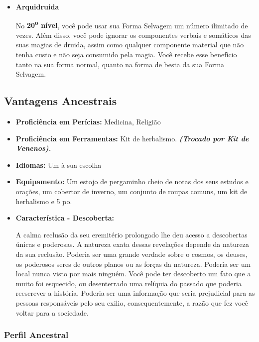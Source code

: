 \documentclass[a4paper,12p]{book}
\begin{document}
\begin{multicols}{2}
\begin{itemize}
		\item \textbf{Arquidruida}
		
		No \textbf{20\textsuperscript{o} nível}, você pode usar sua Forma Selvagem um número ilimitado de vezes. Além disso, você pode ignorar os componentes verbais e somáticos das suas magias de druida, assim como qualquer componente material que não tenha custo e não seja consumido pela magia. Você recebe esse benefício tanto na sua forma normal, quanto na forma de besta da sua Forma Selvagem.
	\end{itemize}
	
	\columnbreak
	\subsection{Vantagens Ancestrais}
	\begin{itemize}
		\item \textbf{Proficiência em Perícias:} Medicina, Religião
		
		\item \textbf{Proficiência em Ferramentas:} 
		Kit de herbalismo. \textbf{\textit{(Trocado por Kit de Venenos).}}
		
		\item \textbf{Idiomas:} Um à sua escolha
		
		\item \textbf{Equipamento:} Um estojo de pergaminho cheio de notas dos seus estudos e orações, um cobertor de inverno, um conjunto de roupas comuns, um kit de herbalismo e 5 po.
		
		\item \textbf{Característica - Descoberta:}
		
		A calma reclusão da seu eremitério prolongado lhe deu acesso a descobertas únicas e poderosas. A natureza exata dessas revelações depende da natureza da sua reclusão. Poderia ser uma grande verdade sobre o cosmos, os deuses, os poderosos seres de outros planos ou as forças da natureza. Poderia ser um local nunca visto por mais ninguém. Você pode ter descoberto um fato que a muito foi esquecido, ou desenterrado uma relíquia do passado que poderia reescrever a história. Poderia ser uma informação que seria prejudicial para as pessoas responsáveis pelo seu exilio, consequentemente, a razão que fez você voltar para a sociedade.
		
		
	\end{itemize}
	
	\subsubsection{Perfil Ancestral}
	

\end{multicols}
\end{document}
